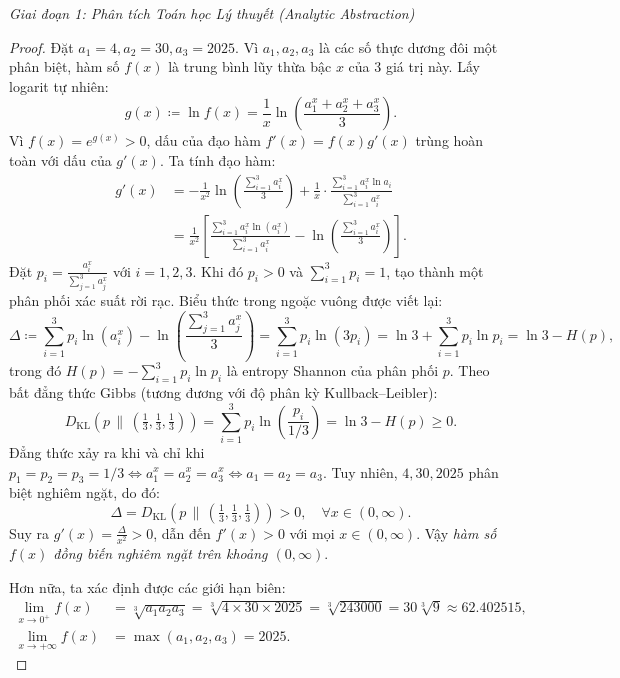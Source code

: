 \documentclass{article}
\begin{document}
\vspace{0.5em}\noindent\emph{Giai đoạn 1: Phân tích Toán học Lý thuyết (Analytic Abstraction)}

\begin{proof}
Đặt $a_1 = 4, a_2 = 30, a_3 = 2025$. Vì $a_1, a_2, a_3$ là các số thực dương đôi một phân biệt, hàm số $f(x)$ là trung bình lũy thừa bậc $x$ của 3 giá trị này.
Lấy logarit tự nhiên:
\begin{equation}
    g(x) \coloneqq \ln f(x) = \frac{1}{x} \ln\left(\frac{a_1^x + a_2^x + a_3^x}{3}\right).
\end{equation}
Vì $f(x) = e^{g(x)} > 0$, dấu của đạo hàm $f'(x) = f(x) g'(x)$ trùng hoàn toàn với dấu của $g'(x)$. Ta tính đạo hàm:
\begin{align}
    g'(x) &= -\frac{1}{x^2}\ln\left(\frac{\sum_{i=1}^3 a_i^x}{3}\right) + \frac{1}{x} \cdot \frac{\sum_{i=1}^3 a_i^x \ln a_i}{\sum_{i=1}^3 a_i^x} \nonumber \\
    &= \frac{1}{x^2} \left[ \frac{\sum_{i=1}^3 a_i^x \ln(a_i^x)}{\sum_{i=1}^3 a_i^x} - \ln\left(\frac{\sum_{i=1}^3 a_i^x}{3}\right) \right].
\end{align}
Đặt $p_i = \frac{a_i^x}{\sum_{j=1}^3 a_j^x}$ với $i = 1, 2, 3$. Khi đó $p_i > 0$ và $\sum_{i=1}^3 p_i = 1$, tạo thành một phân phối xác suất rời rạc.
Biểu thức trong ngoặc vuông được viết lại:
\begin{equation}
    \Delta \coloneqq \sum_{i=1}^3 p_i \ln(a_i^x) - \ln\left(\frac{\sum_{j=1}^3 a_j^x}{3}\right) = \sum_{i=1}^3 p_i \ln(3 p_i) = \ln 3 + \sum_{i=1}^3 p_i \ln p_i = \ln 3 - H(p),
\end{equation}
trong đó $H(p) = -\sum_{i=1}^3 p_i \ln p_i$ là entropy Shannon của phân phối $p$.
Theo bất đẳng thức Gibbs (tương đương với độ phân kỳ Kullback--Leibler):
\begin{equation}
    D_{\mathrm{KL}}\left(p \,\parallel\, \left(\tfrac{1}{3}, \tfrac{1}{3}, \tfrac{1}{3}\right)\right) = \sum_{i=1}^3 p_i \ln\left(\frac{p_i}{1/3}\right) = \ln 3 - H(p) \ge 0.
\end{equation}
Đẳng thức xảy ra khi và chỉ khi $p_1 = p_2 = p_3 = 1/3 \iff a_1^x = a_2^x = a_3^x \iff a_1 = a_2 = a_3$.
Tuy nhiên, $4, 30, 2025$ phân biệt nghiêm ngặt, do đó:
\begin{equation}
    \Delta = D_{\mathrm{KL}}\left(p \,\parallel\, \left(\tfrac{1}{3}, \tfrac{1}{3}, \tfrac{1}{3}\right)\right) > 0, \quad \forall x \in (0, \infty).
\end{equation}
Suy ra $g'(x) = \frac{\Delta}{x^2} > 0$, dẫn đến $f'(x) > 0$ với mọi $x \in (0, \infty)$.
Vậy \emph{hàm số $f(x)$ đồng biến nghiêm ngặt trên khoảng $(0, \infty)$}.

Hơn nữa, ta xác định được các giới hạn biên:
\begin{align}
    \lim_{x\to 0^+} f(x) &= \sqrt[3]{a_1 a_2 a_3} = \sqrt[3]{4 \times 30 \times 2025} = \sqrt[3]{243000} = 30 \sqrt[3]{9} \approx 62.402515, \\
    \lim_{x\to+\infty} f(x) &= \max(a_1, a_2, a_3) = 2025.
\end{align}
\end{proof}
\end{document}
